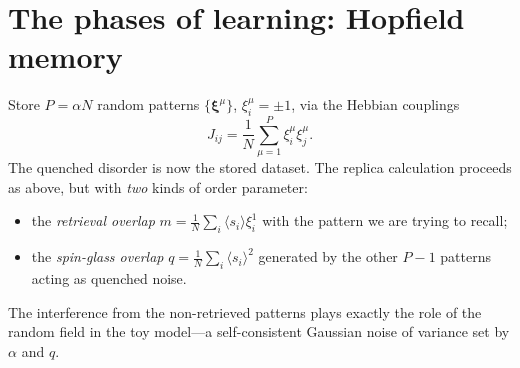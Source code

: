 \documentclass[nobib,justified]{tufte-handout}
\begin{document}
\section{The phases of learning: Hopfield memory}
\label{sec:hopfield}

 Store $P=\alpha N$ random patterns
$\{\boldsymbol\xi^\mu\}$, $\xi_i^\mu=\pm1$, via the Hebbian couplings
\[
  J_{ij}=\frac1N\sum_{\mu=1}^P \xi_i^\mu\xi_j^\mu .
\]
The quenched disorder is now the stored dataset. The replica calculation
proceeds as above, but with \emph{two} kinds of order parameter:
\begin{itemize}
\item the \emph{retrieval overlap} $m=\frac1N\sum_i \langle s_i\rangle
  \xi_i^1$ with the pattern we are trying to recall;
\item the \emph{spin-glass overlap} $q=\frac1N\sum_i\langle s_i\rangle^2$
  generated by the other $P-1$ patterns acting as quenched noise.
\end{itemize}
The interference from the non-retrieved patterns plays exactly the role of
the random field in the toy model---a self-consistent Gaussian noise of
variance set by $\alpha$ and $q$.
\end{document}
